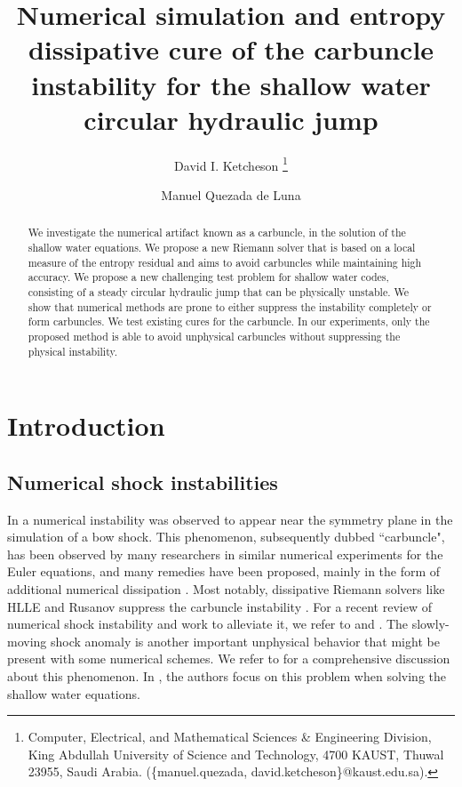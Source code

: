 \documentclass[preprint, 11pt]{article}
\title{Numerical simulation and entropy dissipative cure of the
  carbuncle instability for the shallow water circular hydraulic jump}
\author{
    David I. Ketcheson
  \thanks{
    Computer, Electrical, and Mathematical Sciences \& Engineering Division,
    King Abdullah University of Science and Technology, 4700 KAUST, Thuwal
    23955, Saudi Arabia. (\{manuel.quezada, david.ketcheson\}@kaust.edu.sa).
  }
    \and
    Manuel Quezada de Luna
  \footnotemark[1]
}
\begin{document}
\maketitle

\begin{abstract}
We investigate the numerical artifact known as a carbuncle, in the solution
of the shallow water equations.  We propose a new Riemann solver that is based
on a local measure of the entropy residual and aims to avoid carbuncles while
maintaining high accuracy.
We propose a new challenging test problem for shallow water codes, 
consisting of a steady circular hydraulic
jump that can be physically unstable.  We show that numerical methods are prone to
either suppress the instability completely or form carbuncles.
We test existing cures for the carbuncle. In our experiments, only the proposed
method is able to avoid unphysical carbuncles without suppressing the
physical instability.
\end{abstract}



\section{Introduction}

\subsection{Numerical shock instabilities}

In \cite{peery1988blunt} a numerical instability was observed to
appear near the symmetry plane in the simulation of a bow shock.
This phenomenon, subsequently dubbed ``carbuncle", has been observed by many researchers
in similar numerical experiments for the Euler equations, and many remedies
have been proposed, mainly in the form of additional numerical dissipation
\cite{quirk1997contribution,pandolfi2001numerical,dumbser2004matrix,chauvat2005shock,ismail2009proposed,shen2014stability}.
Most notably, dissipative Riemann solvers like HLLE and Rusanov suppress the carbuncle instability \cite{quirk1997contribution}.
For a recent review of numerical shock instability and work to alleviate it,
we refer to \cite[Section 2.5]{simonnumerical} and \cite{zaide2012numerical}.
{\color{OliveGreen}
  The slowly-moving shock anomaly is another important unphysical behavior that might be present 
  with some numerical schemes. We refer to \cite{zaide2012numerical} for a comprehensive 
  discussion about this phenomenon.
  In \cite{navas2019improved}, the authors focus on this problem when solving the shallow water equations. 
}
\end{document}
